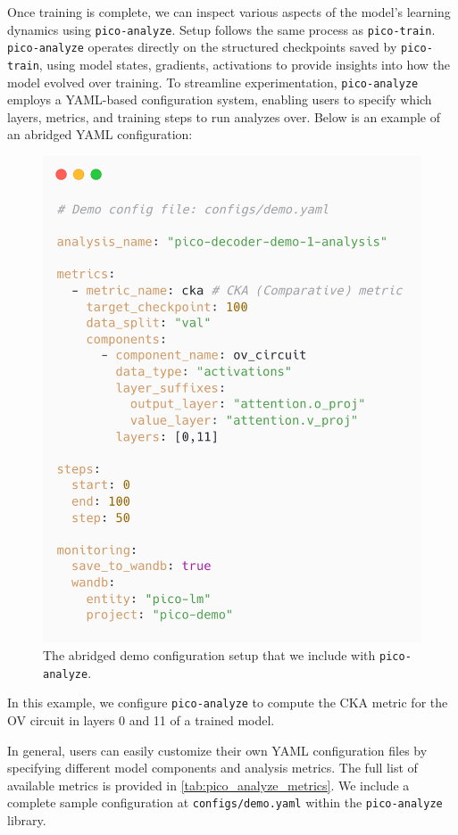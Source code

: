Once training is complete, we can inspect various aspects of the model's learning dynamics using \texttt{pico-analyze}. Setup follows the same process as \texttt{pico-train}. \texttt{pico-analyze} operates directly on the structured checkpoints saved by \texttt{pico-train}, using model states, gradients, activations to provide insights into how the model evolved over training. To streamline experimentation, \texttt{pico-analyze} employs a YAML-based configuration system, enabling users to specify which layers, metrics, and training steps to run analyzes over. Below is an example of an abridged YAML configuration:

\begin{figure}[h!] 
    \centering
    \includegraphics[width=0.7\columnwidth]{chapters/pico/figures/demo/demo_config_analyze.png}
    \caption{The abridged demo configuration setup that we include with \texttt{pico-analyze}.}
    \label{fig:demo_analysis_config}
\end{figure}

In this example, we configure \texttt{pico-analyze} to compute the CKA metric for the OV circuit in layers 0 and 11 of a trained model.

In general, users can easily customize their own YAML configuration files by specifying different model components and analysis metrics. The full list of available metrics is provided in \cref{tab:pico_analyze_metrics}. We include a complete sample configuration at \texttt{configs/demo.yaml} within the \texttt{pico-analyze} library.

